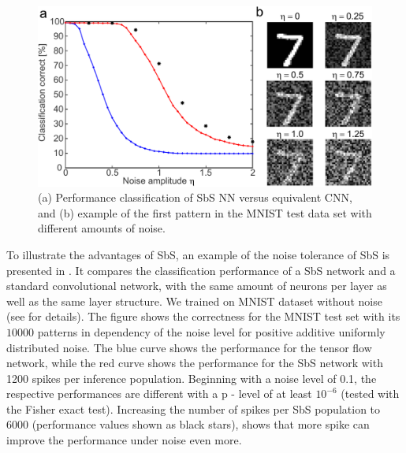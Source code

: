 

\begin{figure}
  \includegraphics[width=\columnwidth]{../figures/sbs_robustnes.pdf}
  \caption{(a) Performance classification of SbS NN versus equivalent CNN, and (b) example of the first pattern in the MNIST test data set with different amounts of noise.}
  \label{fig:robustnes_sbs}
\end{figure}

To illustrate the advantages of SbS, an example of the noise tolerance of SbS is presented in
. It compares the classification performance of
a SbS network and a standard convolutional network, with the same amount of
neurons per layer as well as the same layer structure. We trained on MNIST dataset\cite{lecun1998mnist} without noise (see \cite{rotermund2019Backpropagation} for details). The figure shows the correctness for the MNIST test set with its $10000$ patterns in dependency of the noise level for positive additive
uniformly distributed noise. The blue curve shows the performance for
the tensor flow network, while the red curve shows the performance for
the SbS network with 1200 spikes per inference population. Beginning
with a noise level of 0.1, the respective performances are different
with a p - level of at least $10^{-6}$ (tested with the Fisher exact
test). Increasing the number of spikes per SbS population to 6000
(performance values shown as black stars), shows that more spike can
improve the performance under noise even more.

